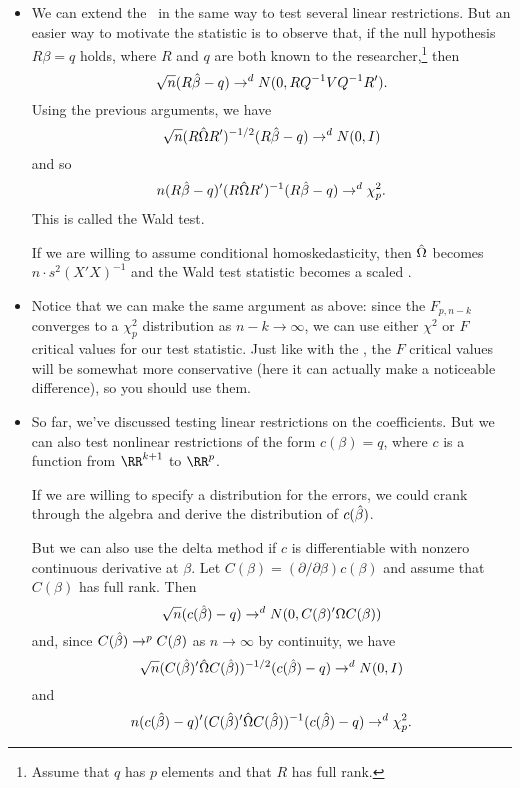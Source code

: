 \begin{itemize}
\item We can extend the \ftest\ in the same way to test several linear
  restrictions.  But an easier way to motivate the statistic is to
  observe that, if the null hypothesis $R \beta = q$ holds, where $R$ and
  $q$ are both known to the researcher,\footnote{Assume that $q$ has
  $p$ elements and that $R$ has full rank.} then
  \begin{equation*}
    \sqrt{n} (R \hat{\beta} - q) \to^d N(0, R Q^{-1} V Q^{-1} R').
  \end{equation*}
  Using the previous arguments, we have
  \begin{equation*}
    \sqrt{n} (R \hat{\Omega} R')^{-1/2} (R \hat{\beta} - q) \to^d N(0, I)
  \end{equation*}
  and so
  \begin{equation*}
    n (R \hat{\beta} - q)' (R \hat{\Omega} R')^{-1} (R \hat{\beta} - q) \to^d \chi^2_p.
  \end{equation*}
  This is called the Wald test.

  If we are willing to assume conditional homoskedasticity, then $\hat{\Omega}$
  becomes $n \cdot s^2 (X'X)^{-1}$ and the Wald test statistic becomes a
  scaled \ftest.

\item Notice that we can make the same argument as above: since the
  $F_{p,n-k}$ converges to a $\chi^2_p$ distribution as $n-k \to \infty$, we can
  use either $\chi^2$ or $F$ critical values for our test statistic.  Just
  like with the \ttest, the $F$ critical values will be somewhat more
  conservative (here it can actually make a noticeable difference), so
  you should use them.

\item So far, we've discussed testing linear restrictions on the
  coefficients.  But we can also test nonlinear restrictions of the
  form $c(\beta) = q$, where $c$ is a function from $\RR^{k+1}$ to
  $\RR^p$.

  If we are willing to specify a distribution for the errors, we could
  crank through the algebra and derive the distribution of $c(\hat{\beta})$.

  But we can also use the delta method if $c$ is differentiable with
  nonzero continuous derivative at $\beta$.  Let $C(\beta) = (\partial/\partial\beta) c(\beta)$ and
  assume that $C(\beta)$ has full rank.  Then
  \begin{equation*}
    \sqrt{n} (c(\hat{\beta}) - q) \to^d N(0, C(\beta)' \Omega C(\beta))
  \end{equation*}
  and, since $C(\hat{\beta}) \to^p C(\beta)$ as $n \to \infty$ by continuity, we have
  \begin{equation*}
    \sqrt{n} (C(\hat{\beta})' \hat{\Omega} C(\hat{\beta}))^{-1/2} (c(\hat{\beta}) - q) \to^d N(0, I)
  \end{equation*}
  and
  \begin{equation*}
    n (c(\hat{\beta}) - q)' (C(\hat{\beta})' \hat{\Omega} C(\hat{\beta}))^{-1} (c(\hat{\beta}) - q) \to^d \chi^2_p.
  \end{equation*}


\end{itemize}
